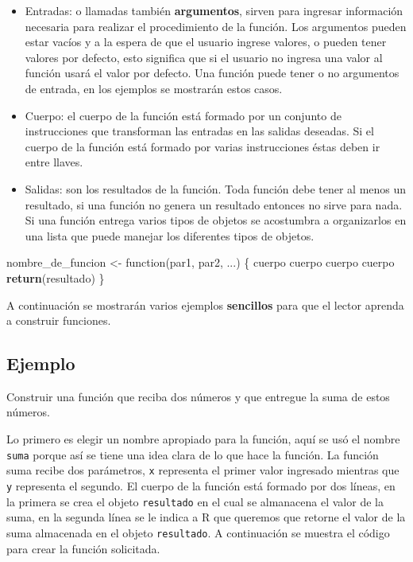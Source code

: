 \documentclass[10pt,]{krantz}
\makeatletter
\newenvironment{Shaded}{\begin{snugshade}}{\end{snugshade}}
\newcommand{\KeywordTok}[1]{\textcolor[rgb]{0.13,0.29,0.53}{\textbf{{#1}}}}
\newcommand{\StringTok}[1]{\textcolor[rgb]{0.31,0.60,0.02}{{#1}}}
\newcommand{\NormalTok}[1]{{#1}}
\providecommand{\tightlist}{%
  \setlength{\itemsep}{0pt}\setlength{\parskip}{0pt}}
\let\proglang=\textsf
\newenvironment{kframe}{%
\medskip{}
\setlength{\fboxsep}{.8em}
 \def\at@end@of@kframe{}%
 \ifinner\ifhmode%
  \def\at@end@of@kframe{\end{minipage}}%
  \begin{minipage}{\columnwidth}%
 \fi\fi%
 \def\FrameCommand##1{\hskip\@totalleftmargin \hskip-\fboxsep
 \colorbox{shadecolor}{##1}\hskip-\fboxsep
     \hskip-\linewidth \hskip-\@totalleftmargin \hskip\columnwidth}%
 \MakeFramed {\advance\hsize-\width
   \@totalleftmargin\z@ \linewidth\hsize
   \@setminipage}}%
 {\par\unskip\endMakeFramed%
 \at@end@of@kframe}
\renewenvironment{Shaded}{\begin{kframe}}{\end{kframe}}
\makeatother
\begin{document}
\begin{itemize}
\tightlist
\item
  Entradas: o llamadas también \textbf{argumentos}, sirven para ingresar
  información necesaria para realizar el procedimiento de la función.
  Los argumentos pueden estar vacíos y a la espera de que el usuario
  ingrese valores, o pueden tener valores por defecto, esto significa
  que si el usuario no ingresa una valor al función usará el valor por
  defecto. Una función puede tener o no argumentos de entrada, en los
  ejemplos se mostrarán estos casos.
\item
  Cuerpo: el cuerpo de la función está formado por un conjunto de
  instrucciones que transforman las entradas en las salidas deseadas. Si
  el cuerpo de la función está formado por varias instrucciones éstas
  deben ir entre llaves.
\item
  Salidas: son los resultados de la función. Toda función debe tener al
  menos un resultado, si una función no genera un resultado entonces no
  sirve para nada. Si una función entrega varios tipos de objetos se
  acostumbra a organizarlos en una lista que puede manejar los
  diferentes tipos de objetos.
\end{itemize}

\begin{Shaded}
\begin{Highlighting}[]
\NormalTok{nombre_de_funcion <-}\StringTok{ }\NormalTok{function(par1, par2, ...) \{}
  \NormalTok{cuerpo}
  \NormalTok{cuerpo}
  \NormalTok{cuerpo}
  \NormalTok{cuerpo}
  \KeywordTok{return}\NormalTok{(resultado)}
\NormalTok{\}}
\end{Highlighting}
\end{Shaded}

A continuación se mostrarán varios ejemplos \textbf{sencillos} para que
el lector aprenda a construir funciones.

\subsection*{Ejemplo}\label{ejemplo-15}


Construir una función que reciba dos números y que entregue la suma de
estos números.

Lo primero es elegir un nombre apropiado para la función, aquí se usó el
nombre \texttt{suma} porque así se tiene una idea clara de lo que hace
la función. La función suma recibe dos parámetros, \texttt{x} representa
el primer valor ingresado mientras que \texttt{y} representa el segundo.
El cuerpo de la función está formado por dos líneas, en la primera se
crea el objeto \texttt{resultado} en el cual se almanacena el valor de
la suma, en la segunda línea se le indica a \proglang{R} que queremos
que retorne el valor de la suma almacenada en el objeto
\texttt{resultado}. A continuación se muestra el código para crear la
función solicitada.
\end{document}
